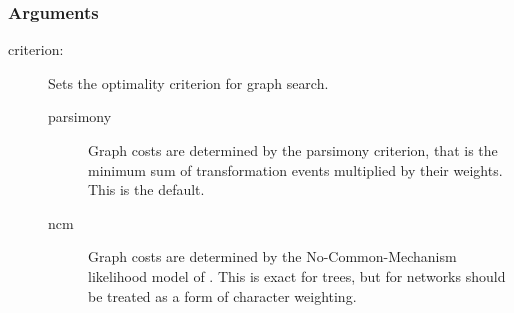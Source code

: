 	\subsubsection{Arguments}
	\begin{description}
		
		
	
		
		
		
		
			
		\item[criterion:] Sets the optimality criterion for graph search.
			
		\begin{description}
			
			\item[parsimony] Graph costs are determined by the parsimony criterion, 
			that is the minimum sum of transformation events multiplied by their weights. 
			This is the default.
			
			\item[ncm] Graph costs are determined by the No-Common-Mechanism 
			likelihood model of \citep{TuffleyandSteel1997}. This is exact for trees, but 
			for networks should be treated as a form of character weighting.  
			

\end{description}
\end{description}
